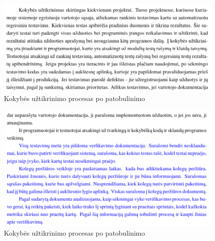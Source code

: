 \documentclass{VUMIFPSkursinis}
\begin{document}
				\begin{figure}[!htbp]
					\includegraphics[scale=0.8]{img/kokybepotwo}
					\caption{Kokybės užtikrinimo procesas po patobulinimo} %
					\label{img:ProfilisPo}
				\end{figure}
				\begin{figure}[!htbp]
					\includegraphics[scale=0.8]{img/kokybepothree}
					\caption{Kokybės užtikrinimo procesas po patobulinimo} %
					\label{img:ProfilisPo}
				\end{figure}

\pagebreak
\end{document}

